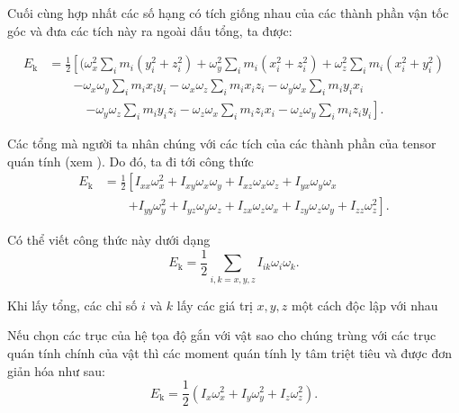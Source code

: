 \noindent
Cuối cùng hợp nhất các số hạng có tích giống nhau của các thành phần vận tốc góc và đưa các tích này ra ngoài dấu tổng, ta được:

\begin{align*}
	E_{\text{k}} &= \frac{1}{2}\left[(\omega_x^2 \sum_i m_i (y_i^2+z_i^2) + \omega_y^2 \sum_i m_i (x_i^2+z_i^2) + \omega_z^2 \sum_i m_i (x_i^2+y_i^2) \right.\\
	&\quad\quad\left. - \omega_x\omega_y \sum_i m_ix_iy_i - \omega_x\omega_z \sum_i m_i x_iz_i - \omega_y\omega_x \sum_i m_i y_ix_i \right.\\
	&\quad\quad\quad\left. -\omega_y\omega_z \sum_i m_i y_iz_i - \omega_z\omega_x \sum_i m_i z_ix_i - \omega_z\omega_y \sum_i m_i z_iy_i\right].
\end{align*}

Các tổng mà người ta nhân chúng với các tích của các thành phần của tensor quán tính (xem ). Do đó, ta đi tới công thức
\begin{align}
	E_{\text{k}} &= \frac{1}{2}\left[I_{xx}\omega_x^2 + I_{xy}\omega_x\omega_y + I_{xz}\omega_x\omega_z + I_{yx}\omega_y\omega_x \right.\nonumber\\
	&\quad\quad\left. + I_{yy}\omega_y^2 + I_{yz}\omega_y\omega_z + I_{zx}\omega_z\omega_x + I_{zy}\omega_z\omega_y + I_{zz}\omega_z^2\right].\label{eq:5_50}
\end{align}

\noindent
Có thể viết công thức này dưới dạng
\begin{equation}\label{eq:5_51}
	E_{\text{k}} = \frac{1}{2}\sum_{i,k=x,y,z} I_{ik}\omega_i\omega_k.
\end{equation}

\noindent
Khi lấy tổng, các chỉ số $i$ và $k$ lấy các giá trị $x, y, z$ một cách độc lập với nhau

Nếu chọn các trục của hệ tọa độ gắn với vật sao cho chúng trùng với các trục quán tính chính của vật thì các moment quán tính ly tâm triệt tiêu và  được đơn giản hóa như sau:
\begin{equation}\label{eq:5_52}
	E_{\text{k}} = \frac{1}{2}(I_x\omega_x^2 + I_y\omega_y^2 + I_z\omega_z^2).
\end{equation}


